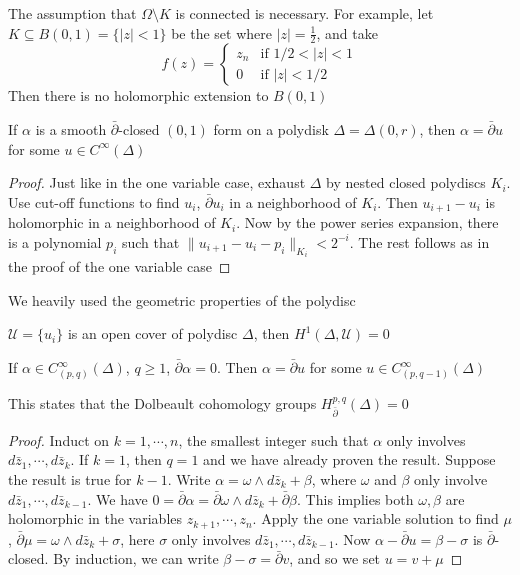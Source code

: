 \documentclass[../main.tex]{subfiles}
\begin{document}
\begin{note}
The assumption that $\Omega\setminus K$ is connected is necessary. For example, let $K\subseteq B(0,1)=\{|z|<1\}$ be the set where $|z|=\frac{1}{2}$, and take
\[f(z)=\begin{cases}
z_n &\text{if }1/2<|z|<1 \\
0 &\text{if }|z|<1/2
\end{cases}\]
Then there is no holomorphic extension to $B(0,1)$
\end{note}

\begin{proposition}
If $\alpha$ is a smooth $\bar\partial$-closed $(0,1)$ form on a polydisk $\Delta=\Delta(0,r)$, then $\alpha=\bar\partial u$ for some $u\in C^\infty(\Delta)$
\end{proposition}

\begin{proof}
Just like in the one variable case, exhaust $\Delta$ by nested closed polydiscs $K_i$. Use cut-off functions to find $u_i$, $\bar\partial u_i$ in a neighborhood of $K_i$. Then $u_{i+1}-u_i$ is holomorphic in a neighborhood of $K_i$. Now by the power series expansion, there is a polynomial $p_i$ such that $\|u_{i+1}-u_i-p_i\|_{K_i}<2^{-i}$. The rest follows as in the proof of the one variable case
\end{proof}

\begin{note}
We heavily used the geometric properties of the polydisc
\end{note}

\begin{corollary}
$\mathcal U=\{u_i\}$ is an open cover of polydisc $\Delta$, then $H^1(\Delta,\mathcal U)=0$
\end{corollary}

\begin{theorem}
If $\alpha\in C^\infty_{(p,q)}(\Delta)$, $q\geq1$, $\bar\partial\alpha=0$. Then $\alpha=\bar\partial u$ for some $u\in C^\infty_{(p,q-1)}(\Delta)$
\end{theorem}

\begin{remark}
This states that the Dolbeault cohomology groups $H^{p,q}_{\bar\partial}(\Delta)=0$
\end{remark}

\begin{proof}
Induct on $k=1,\cdots,n$, the smallest integer such that $\alpha$ only involves $d\bar z_1,\cdots,d\bar z_k$. If $k=1$, then $q=1$ and we have already proven the result. Suppose the result is true for $k-1$. Write $\alpha=\omega\wedge d\bar z_k+\beta$, where $\omega$ and $\beta$ only involve $d\bar z_1,\cdots,d\bar z_{k-1}$. We have $0=\bar\partial\alpha=\bar\partial\omega\wedge d\bar z_k+\bar\partial\beta$. This implies both $\omega,\beta$ are holomorphic in the variables $z_{k+1},\cdots,z_n$. Apply the one variable solution to find $\mu$, $\bar\partial\mu=\omega\wedge d\bar z_k+\sigma$, here $\sigma$ only involves $d\bar z_1,\cdots,d\bar z_{k-1}$. Now $\alpha-\bar\partial u=\beta-\sigma$ is $\bar\partial$-closed. By induction, we can write $\beta-\sigma=\bar\partial v$, and so we set $u=v+\mu$
\end{proof}
\end{document}
